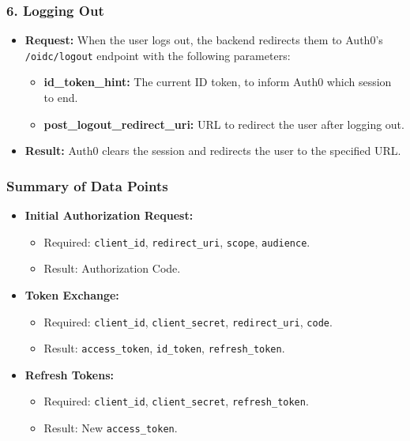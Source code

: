 \documentclass[11pt]{article}
\begin{document}
\subsubsection*{6. \textbf{Logging Out}}
\begin{itemize}
    \item \textbf{Request:} When the user logs out, the backend redirects them to Auth0's \texttt{/oidc/logout} endpoint with the following parameters:
          \begin{itemize}
              \item \textbf{id\_token\_hint:} The current ID token, to inform Auth0 which session to end.
              \item \textbf{post\_logout\_redirect\_uri:} URL to redirect the user after logging out.
          \end{itemize}
    \item \textbf{Result:} Auth0 clears the session and redirects the user to the specified URL.
\end{itemize}

\subsubsection*{Summary of Data Points}
\begin{itemize}
    \item \textbf{Initial Authorization Request:}
          \begin{itemize}
              \item Required: \texttt{client\_id}, \texttt{redirect\_uri}, \texttt{scope}, \texttt{audience}.
              \item Result: Authorization Code.
          \end{itemize}
    \item \textbf{Token Exchange:}
          \begin{itemize}
              \item Required: \texttt{client\_id}, \texttt{client\_secret}, \texttt{redirect\_uri}, \texttt{code}.
              \item Result: \texttt{access\_token}, \texttt{id\_token}, \texttt{refresh\_token}.
          \end{itemize}
    \item \textbf{Refresh Tokens:}
          \begin{itemize}
              \item Required: \texttt{client\_id}, \texttt{client\_secret}, \texttt{refresh\_token}.
              \item Result: New \texttt{access\_token}.
          \end{itemize}
\end{itemize}
\end{document}
